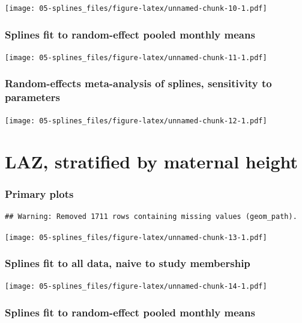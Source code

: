 \documentclass[9pt,]{book}
\begin{document}
\texttt{[image: 05-splines\_files/figure-latex/unnamed-chunk-10-1.pdf]}

\subsubsection{Splines fit to random-effect pooled monthly
means}\label{splines-fit-to-random-effect-pooled-monthly-means-2}

\texttt{[image: 05-splines\_files/figure-latex/unnamed-chunk-11-1.pdf]}

\subsubsection{Random-effects meta-analysis of splines, sensitivity to
parameters}\label{random-effects-meta-analysis-of-splines-sensitivity-to-parameters-2}

\texttt{[image: 05-splines\_files/figure-latex/unnamed-chunk-12-1.pdf]}

\section{LAZ, stratified by maternal
height}\label{laz-stratified-by-maternal-height}

\subsubsection{Primary plots}\label{primary-plots-3}

\begin{verbatim}
## Warning: Removed 1711 rows containing missing values (geom_path).
\end{verbatim}

\texttt{[image: 05-splines\_files/figure-latex/unnamed-chunk-13-1.pdf]}

\subsubsection{Splines fit to all data, naive to study
membership}\label{splines-fit-to-all-data-naive-to-study-membership-3}

\texttt{[image: 05-splines\_files/figure-latex/unnamed-chunk-14-1.pdf]}

\subsubsection{Splines fit to random-effect pooled monthly
means}\label{splines-fit-to-random-effect-pooled-monthly-means-3}
\end{document}
